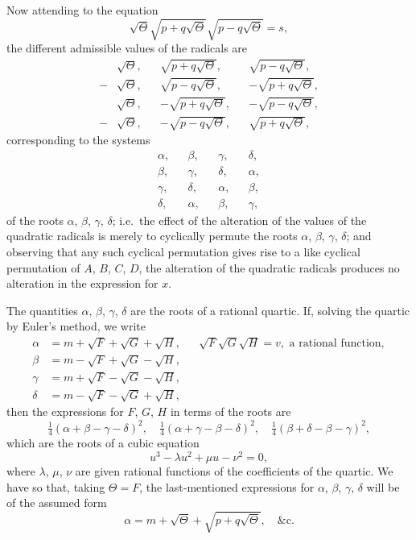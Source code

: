 \documentclass[11pt,a4paper]{article}
\theoremstyle{plain}
\begin{document}
Now attending to the equation
\[
\sqrt{\Theta}\sqrt{p+q\sqrt{\Theta}}\sqrt{p-q\sqrt{\Theta}} = s,
\]
the different admissible values of the radicals are
\begin{align*}
&\sqrt{\Theta}, &&\sqrt{p+q\sqrt{\Theta}}, &&\sqrt{p-q\sqrt{\Theta}}, \\
-&\sqrt{\Theta}, &&\sqrt{p-q\sqrt{\Theta}}, &&-\sqrt{p+q\sqrt{\Theta}}, \\
&\sqrt{\Theta}, &&-\sqrt{p+q\sqrt{\Theta}}, &&-\sqrt{p-q\sqrt{\Theta}}, \\
-&\sqrt{\Theta}, &&-\sqrt{p-q\sqrt{\Theta}}, &&\sqrt{p+q\sqrt{\Theta}},
\end{align*}
corresponding to the systems
\begin{align*}
\alpha, && \beta, && \gamma, && \delta, \\
\beta, && \gamma, && \delta, && \alpha, \\
\gamma, && \delta, && \alpha, && \beta, \\
\delta, && \alpha, && \beta, && \gamma,
\end{align*}
of the roots $\alpha$, $\beta$, $\gamma$, $\delta$; i.e.\ the effect of the alteration of the values of the quadratic radicals is merely to cyclically permute the roots $\alpha$, $\beta$, $\gamma$, $\delta$; and observing that any such cyclical permutation gives rise to a like cyclical permutation of $A$, $B$, $C$, $D$, the alteration of the quadratic radicals produces no alteration in the expression for $x$.

The quantities $\alpha$, $\beta$, $\gamma$, $\delta$ are the roots of a rational quartic. If, solving the quartic by Euler's method, we write
\begin{align*}
\alpha &= m + \sqrt{F} + \sqrt{G} + \sqrt{H}, && \sqrt{F}\sqrt{G}\sqrt{H} = v, \text{ a rational function}, \\
\beta &= m - \sqrt{F} + \sqrt{G} - \sqrt{H}, \\
\gamma &= m + \sqrt{F} - \sqrt{G} - \sqrt{H}, \\
\delta &= m - \sqrt{F} - \sqrt{G} + \sqrt{H},
\end{align*}
then the expressions for $F$, $G$, $H$ in terms of the roots are
\[
\tfrac{1}{4}(\alpha + \beta - \gamma - \delta)^2, \quad \tfrac{1}{4}(\alpha + \gamma - \beta - \delta)^2, \quad \tfrac{1}{4}(\beta + \delta - \beta - \gamma)^2,
\]
which are the roots of a cubic equation
\[
u^3 - \lambda u^2 + \mu u - \nu^2 = 0,
\]
where $\lambda$, $\mu$, $\nu$ are given rational functions of the coefficients of the quartic. We have so that, taking $\Theta = F$, the last-mentioned expressions for $\alpha$, $\beta$, $\gamma$, $\delta$ will be of the assumed form
\[
\alpha = m + \sqrt{\Theta} + \sqrt{p+q\sqrt{\Theta}}, \quad \&\text{c.}
\]
\end{document}
